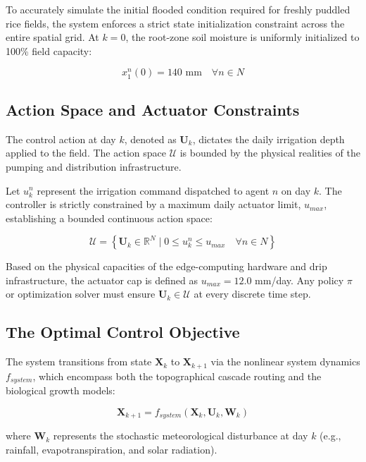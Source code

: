 \documentclass[11pt, a4paper]{article}
\begin{document}
To accurately simulate the initial flooded condition required for freshly puddled rice fields, the system enforces a strict state initialization constraint across the entire spatial grid. At $k = 0$, the root-zone soil moisture is uniformly initialized to 100\% field capacity:

\begin{equation}
    x_1^n(0) = 140 \text{ mm} \quad \forall n \in N
\end{equation}

\subsection{Action Space and Actuator Constraints}

The control action at day $k$, denoted as $\mathbf{U}_k$, dictates the daily irrigation depth applied to the field. The action space $\mathcal{U}$ is bounded by the physical realities of the pumping and distribution infrastructure. 

Let $u^n_k$ represent the irrigation command dispatched to agent $n$ on day $k$. The controller is strictly constrained by a maximum daily actuator limit, $u_{max}$, establishing a bounded continuous action space:

\begin{equation}
    \mathcal{U} = \left\{ \mathbf{U}_k \in \mathbb{R}^N \mid 0 \le u^n_k \le u_{max} \quad \forall n \in N \right\}
\end{equation}

Based on the physical capacities of the edge-computing hardware and drip infrastructure, the actuator cap is defined as $u_{max} = 12.0$ mm/day. Any policy $\pi$ or optimization solver must ensure $\mathbf{U}_k \in \mathcal{U}$ at every discrete time step.

\subsection{The Optimal Control Objective}

The system transitions from state $\mathbf{X}_k$ to $\mathbf{X}_{k+1}$ via the nonlinear system dynamics $f_{system}$, which encompass both the topographical cascade routing and the biological growth models:

\begin{equation}
    \mathbf{X}_{k+1} = f_{system}(\mathbf{X}_k, \mathbf{U}_k, \mathbf{W}_k)
\end{equation}

where $\mathbf{W}_k$ represents the stochastic meteorological disturbance at day $k$ (e.g., rainfall, evapotranspiration, and solar radiation). 
\end{document}
